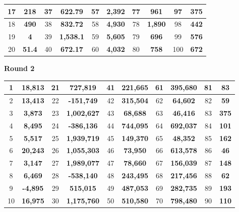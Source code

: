 \documentclass[11pt]{article}
\begin{document}
\begin{table}[h]
\begin{tabular}{|c|c||c|c||c|c||c|c||c|c|}
\hline
17 & \textbf{218} & 37 & \textbf{622.79} & 57 & \textbf{2,392} & 77 & \textbf{961} & 97 & \textbf{375} \\
\hline
18 & \textbf{490} & 38 & \textbf{832.72} & 58 & \textbf{4,930} & 78 & \textbf{1,890} & 98 & \textbf{442} \\
\hline
19 & \textbf{4} & 39 & \textbf{1,538.1} & 59 & \textbf{5,605} & 79 & \textbf{696} & 99 & \textbf{576} \\
\hline
20 & \textbf{51.4} & 40 & \textbf{672.17} & 60 & \textbf{4,032} & 80 & \textbf{758} & 100 & \textbf{672} \\
\hline
\end{tabular}
\end{table}
\newpage
\begin{center}
\textbf{Round 2}
\end{center}
\begin{table}[h]
\centering
\begin{tabular}{|c|c||c|c||c|c||c|c||c|c|}
\hline
1 & \textbf{18,813} & 21 & \textbf{727,819} & 41 & \textbf{221,665} & 61 & \textbf{395,680} & 81 & \textbf{83} \\
\hline
2 & \textbf{13,413} & 22 & \textbf{-151,749} & 42 & \textbf{315,504} & 62 & \textbf{64,602} & 82 & \textbf{59} \\
\hline
3 & \textbf{3,873} & 23 & \textbf{1,002,627} & 43 & \textbf{68,688} & 63 & \textbf{46,416} & 83 & \textbf{375} \\
\hline
4 & \textbf{8,495} & 24 & \textbf{-386,136} & 44 & \textbf{744,095} & 64 & \textbf{692,037} & 84 & \textbf{101} \\
\hline
5 & \textbf{5,517} & 25 & \textbf{1,939,719} & 45 & \textbf{149,370} & 65 & \textbf{48,352} & 85 & \textbf{162} \\
\hline
6 & \textbf{20,243} & 26 & \textbf{1,055,303} & 46 & \textbf{73,950} & 66 & \textbf{613,578} & 86 & \textbf{46} \\
\hline
7 & \textbf{3,147} & 27 & \textbf{1,989,077} & 47 & \textbf{78,660} & 67 & \textbf{156,039} & 87 & \textbf{148} \\
\hline
8 & \textbf{6,469} & 28 & \textbf{-538,140} & 48 & \textbf{243,495} & 68 & \textbf{217,456} & 88 & \textbf{62} \\
\hline
9 & \textbf{-4,895} & 29 & \textbf{515,015} & 49 & \textbf{487,053} & 69 & \textbf{282,735} & 89 & \textbf{193} \\
\hline
10 & \textbf{16,975} & 30 & \textbf{1,175,760} & 50 & \textbf{510,580} & 70 & \textbf{798,480} & 90 & \textbf{110} \\

\end{tabular}
\end{table}
\end{document}
